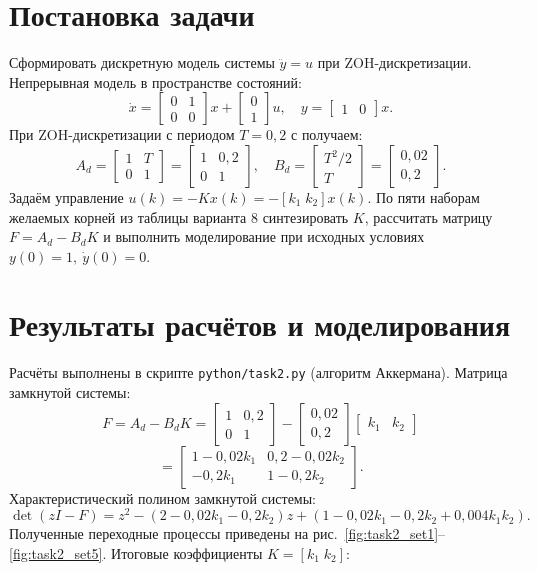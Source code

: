 \section{Постановка задачи}
Сформировать дискретную модель системы \(\ddot{y} = u\) при ZOH-дискретизации. Непрерывная модель в пространстве состояний:
\[
  \dot{x} = \begin{bmatrix} 0 & 1 \\ 0 & 0 \end{bmatrix} x + \begin{bmatrix} 0 \\ 1 \end{bmatrix} u, \quad y = \begin{bmatrix} 1 & 0 \end{bmatrix} x.
\]
При ZOH-дискретизации с периодом \(T = 0{,}2\) с получаем:
\[
  A_d = \begin{bmatrix} 1 & T \\ 0 & 1 \end{bmatrix} = \begin{bmatrix} 1 & 0{,}2 \\ 0 & 1 \end{bmatrix}, \quad B_d = \begin{bmatrix} T^2/2 \\ T \end{bmatrix} = \begin{bmatrix} 0{,}02 \\ 0{,}2 \end{bmatrix}.
\]
Задаём управление \(u(k) = -Kx(k) = -[k_1\;k_2]x(k)\). По пяти наборам желаемых корней из таблицы варианта 8 синтезировать \(K\), рассчитать матрицу \(F=A_d-B_dK\) и выполнить моделирование при исходных условиях \(y(0)=1,\ \dot{y}(0)=0\).

\section{Результаты расчётов и моделирования}
Расчёты выполнены в скрипте \texttt{python/task2.py} (алгоритм Аккермана). Матрица замкнутой системы:
\[
  F = A_d - B_d K = \begin{bmatrix} 1 & 0{,}2 \\ 0 & 1 \end{bmatrix} - \begin{bmatrix} 0{,}02 \\ 0{,}2 \end{bmatrix} \begin{bmatrix} k_1 & k_2 \end{bmatrix}
\]
\[
  = \begin{bmatrix} 1-0{,}02k_1 & 0{,}2-0{,}02k_2 \\ -0{,}2k_1 & 1-0{,}2k_2 \end{bmatrix}.
\]
Характеристический полином замкнутой системы:
\[
  \det(zI - F) = z^2 - (2-0{,}02k_1-0{,}2k_2)z + (1-0{,}02k_1-0{,}2k_2+0{,}004k_1k_2).
\]
Полученные переходные процессы приведены на рис.~\ref{fig:task2_set1}–\ref{fig:task2_set5}. Итоговые коэффициенты \(K=[k_1\;k_2]\):

